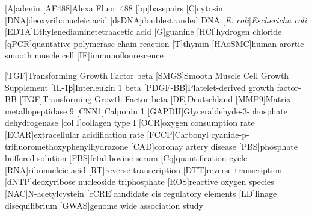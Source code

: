 \begin{acronym}
[A]{adenin}
[AF488]{Alexa Fluor\textsuperscript{\textregistered}~488}
[bp]{basepairs}
[C]{cytosin}
[DNA]{deoxyribonucleic acid}
[dsDNA]{doublestranded DNA}
[\textit{E. coli}]{\textit{Eschericha coli}}
[EDTA]{Ethylenediaminetetraacetic acid}
[G]{guanine}
[HCl]{hydrogen chloride}
[qPCR]{quantative polymerase chain reaction}
[T]{thymin}
[HAoSMC]{human arortic smooth muscle cell}
[IF]{immunoflourescence}


[TGF\beta]{Transforming Growth Factor beta}
[SMGS]{Smooth Muscle Cell Growth Supplement}
[IL-1β]{Interleukin 1 beta}
[PDGF-BB]{Platelet-derived growth factor-BB}
[TGF\beta]{Transforming Growth Factor beta}
[DE]{Deutschland}
[MMP9]{Matrix metallopeptidase 9}
[CNN1]{Calponin 1}
[GAPDH]{Glyceraldehyde-3-phosphate dehydrogenase}
[col I]{collagen type I}
[OCR]{oxygen consumption rate}
[ECAR]{extracellular acidification rate}
[FCCP]{Carbonyl cyanide-p-trifluoromethoxyphenylhydrazone}
[CAD]{coronay artery disease}
[PBS]{phosphate buffered solution}
[FBS]{fetal bovine serum}
[Cq]{quantification cycle}
[RNA]{ribonucleic acid}
[RT]{reverse transcription}
[DTT]{reverse transcription}
[dNTP]{deoxyribose nucleoside triphosphate}
[ROS]{reactive oxygen species}
[NAC]{N-acetylcystein}
[cCRE]{candidate cis regulatory elements}
[LD]{linage disequilibrium}
[GWAS]{genome wide association study}
\end{acronym}

